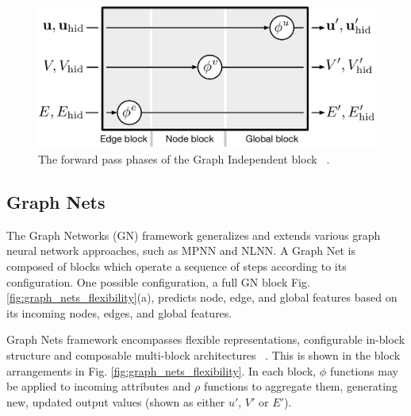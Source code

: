 \begin{figure}[H]
    \centering
    \includegraphics[width=.7\textwidth]{fig/content/graph_nets/blocks/independent.pdf}
    \caption{The forward pass phases of the Graph Independent block ~\cite{Battaglia_2018}.}
    \label{fig:independent}
\end{figure}

\subsection{Graph Nets}

The Graph Networks (GN) framework generalizes and extends various graph neural network approaches, such as MPNN and NLNN. A Graph Net is composed of blocks which operate a sequence of steps according to its configuration. One possible configuration, a full GN block Fig.\ref{fig:graph_nets_flexibility}(a), predicts node, edge, and global features based on its incoming nodes, edges, and global features.

Graph Nets framework encompasses flexible representations, configurable in-block structure and composable multi-block architectures ~\cite{Battaglia_2018}. This is shown in the block arrangements in Fig. \ref{fig:graph_nets_flexibility}. In each block, $\phi$ functions may be applied to incoming attributes and $\rho$ functions to aggregate them, generating new, updated output values (shown as either $u'$, $V'$ or $E'$).

